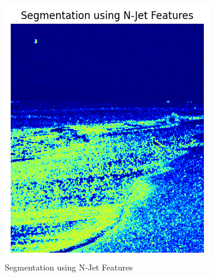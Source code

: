\documentclass[12pt]{article}
\begin{document}
\begin{figure}[h]
    \centering
    \begin{minipage}{0.48\textwidth}
        \centering
        \includegraphics[width=\textwidth]{pics/a6-3.3-1.png}
        \caption{Segmentation using N-Jet Features}
        \label{fig:3.3-1}
    \end{minipage}
    \hfill
    \begin{minipage}{0.48\textwidth}
        \centering

\end{minipage}
\end{figure}
\end{document}
